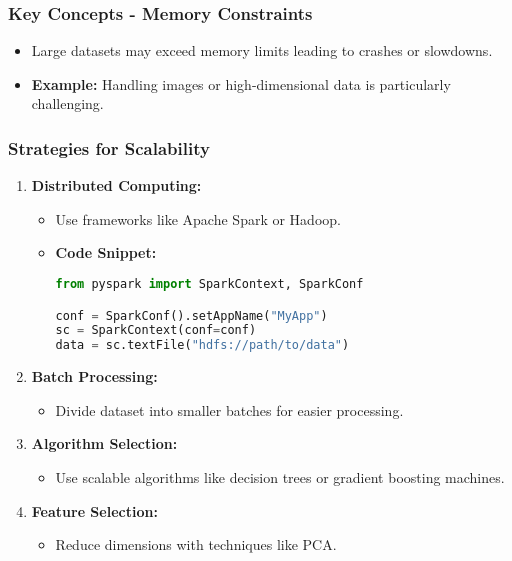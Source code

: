 \documentclass[aspectratio=169]{beamer}
\begin{document}
\begin{frame}
    \frametitle{Key Concepts - Memory Constraints}
    \begin{itemize}
        \item Large datasets may exceed memory limits leading to crashes or slowdowns.
        \item \textbf{Example:} Handling images or high-dimensional data is particularly challenging.
    \end{itemize}
\end{frame}

\begin{frame}[fragile]
    \frametitle{Strategies for Scalability}
    \begin{enumerate}
        \item \textbf{Distributed Computing:}
          \begin{itemize}
              \item Use frameworks like Apache Spark or Hadoop.
              \item \textbf{Code Snippet:}
              \begin{lstlisting}[language=Python]
from pyspark import SparkContext, SparkConf

conf = SparkConf().setAppName("MyApp")
sc = SparkContext(conf=conf)
data = sc.textFile("hdfs://path/to/data")
              \end{lstlisting}
          \end{itemize}
        \item \textbf{Batch Processing:}
          \begin{itemize}
              \item Divide dataset into smaller batches for easier processing.
          \end{itemize}
        \item \textbf{Algorithm Selection:}
          \begin{itemize}
              \item Use scalable algorithms like decision trees or gradient boosting machines.
          \end{itemize}
        \item \textbf{Feature Selection:}
          \begin{itemize}
              \item Reduce dimensions with techniques like PCA.
          \end{itemize}
    \end{enumerate}
\end{frame}
\end{document}
